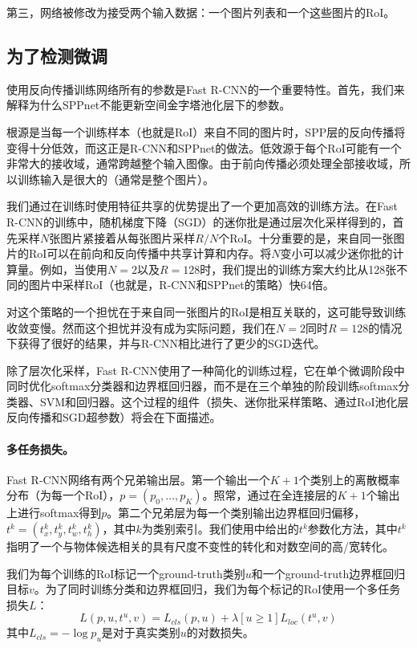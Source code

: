 \documentclass[../main]{subfile}
\begin{document}
第三，网络被修改为接受两个输入数据：一个图片列表和一个这些图片的RoI。

\subsection{为了检测微调}

使用反向传播训练网络所有的参数是Fast R-CNN的一个重要特性。首先，我们来解释为什么SPPnet不能更新空间金字塔池化层下的参数。

根源是当每一个训练样本（也就是RoI）来自不同的图片时，SPP层的反向传播将变得十分低效，而这正是R-CNN和SPPnet的做法。低效源于每个RoI可能有一个非常大的接收域，通常跨越整个输入图像。由于前向传播必须处理全部接收域，所以训练输入是很大的（通常是整个图片）。

我们通过在训练时使用特征共享的优势提出了一个更加高效的训练方法。在Fast R-CNN的训练中，随机梯度下降（SGD）的迷你批是通过层次化采样得到的，首先采样$N$张图片紧接着从每张图片采样$R/N$个RoI。十分重要的是，来自同一张图片的RoI可以在前向和反向传播中共享计算和内存。将$N$变小可以减少迷你批的计算量。例如，当使用$N=2$以及$R=128$时，我们提出的训练方案大约比从128张不同的图片中采样RoI（也就是，R-CNN和SPPnet的策略）快64倍。

对这个策略的一个担忧在于来自同一张图片的RoI是相互关联的，这可能导致训练收敛变慢。然而这个担忧并没有成为实际问题，我们在$N=2$同时$R=128$的情况下获得了很好的结果，并与R-CNN相比进行了更少的SGD迭代。

除了层次化采样，Fast R-CNN使用了一种简化的训练过程，它在单个微调阶段中同时优化softmax分类器和边界框回归器，而不是在三个单独的阶段训练softmax分类器、SVM和回归器\cite{rcnn, spp}。这个过程的组件（损失、迷你批采样策略、通过RoI池化层反向传播和SGD超参数）将会在下面描述。

\paragraph{多任务损失。}Fast R-CNN网络有两个兄弟输出层。第一个输出一个$K+1$个类别上的离散概率分布（为每一个RoI），$p=(p_0,\dots, p_K)$。照常，通过在全连接层的$K+1$个输出上进行softmax得到$p$。第二个兄弟层为每一个类别输出边界框回归偏移，$t^k=(t_x^k, t_y^k, t_w^k, t_h^k)$，其中$k$为类别索引。我们使用\cite{rcnn}中给出的$t^k$参数化方法，其中$t^k$指明了一个与物体候选相关的具有尺度不变性的转化和对数空间的高/宽转化。

我们为每个训练的RoI标记一个ground-truth类别$u$和一个ground-truth边界框回归目标$v$。为了同时训练分类和边界框回归，我们为每个标记的RoI使用一个多任务损失$L$：
\begin{equation} \label{equ:total}
    L(p, u, t^u, v) = L_{cls}(p, u) + \lambda[u\ge1]L_{loc}(t^u, v)
\end{equation}
其中$L_{cls}=-\log p_u$是对于真实类别$u$的对数损失。
\end{document}
